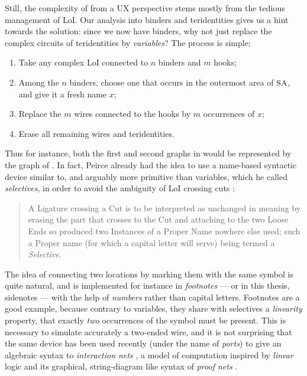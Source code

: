 Still, the complexity of  from a UX perspective stems mostly from the
tedious management of LoI. Our analysis into binders and teridentities gives us
a hint towards the solution: since we now have binders, why not just replace
the complex circuits of teridentities by \emph{variables}? The process is
simple:
\begin{enumerate}
  \item Take any complex LoI connected to $n$ binders and $m$ hooks;
  \item Among the $n$ binders, choose one that occurs in the outermost area of
  $\small\textsc{SA}$, and give it a fresh name $x$;
  \item Replace the $m$ wires connected to the hooks by $m$ occurrences of $x$;
  \item Erase all remaining wires and teridentities.
\end{enumerate}
Thus for instance, both the first and second graphs in
 would be represented by the graph of
. In fact, Peirce already had the idea to use a
name-based syntactic device similar to, and arguably more primitive than
variables, which he called \emph{selectives}, in order to avoid the ambiguity of
LoI crossing cuts \cite[p.~531]{peirce_prolegomena_1906}:
\begin{quote}
A Ligature crossing a Cut is to be interpreted as unchanged in meaning by
erasing the part that crosses to the Cut and attaching to the two Loose Ends so
produced two Instances of a Proper Name nowhere else used; such a Proper name
(for which a capital letter will serve) being termed a \emph{Selective}.
\end{quote}
The idea of connecting two locations by marking them with the same symbol is
quite natural, and is implemented for instance in \emph{footnotes} --- or in
this thesis, sidenotes --- with the help of \emph{numbers} rather than capital
letters. Footnotes are a good example, because contrary to variables, they share
with selectives a \emph{linearity} property, that exactly \emph{two} occurrences
of the symbol must be present. This is necessary to simulate accurately a
two-ended wire, and it is not surprising that the same device has been used
recently (under the name of \emph{ports}) to give an algebraic syntax to
\emph{interaction nets} , a model of
computation inspired by \emph{linear} logic and its graphical, string-diagram
like syntax of \emph{proof nets} \cite{girard-linear-1987}.

